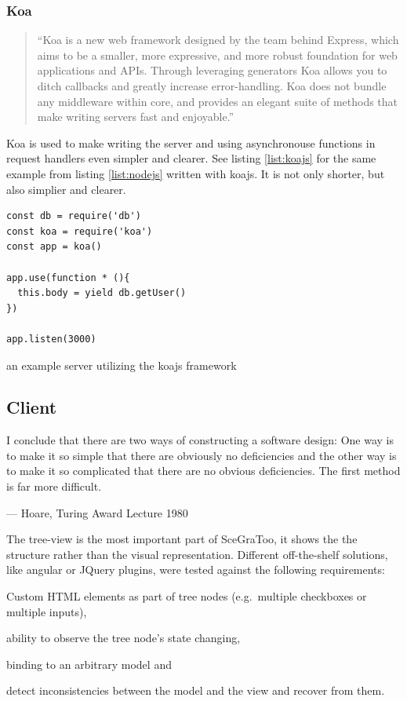 \subsubsection{Koa}
\label{par:Koa}
\begin{quote}
  ``Koa is a new web framework designed by the team behind Express, which aims to be a smaller, more expressive, and more robust foundation for web applications and APIs. Through leveraging generators Koa allows you to ditch callbacks and greatly increase error-handling. Koa does not bundle any middleware within core, and provides an elegant suite of methods that make writing servers fast and enjoyable.'' \cite{koajs}
\end{quote}

Koa is used to make writing the server and using asynchronouse functions in request handlers even simpler and clearer.
See listing \ref{list:koajs} for the same example from listing \ref{list:nodejs} written with koajs.
It is not only shorter, but also simplier and clearer.

\begin{listing}
  \begin{verbatim}
const db = require('db')
const koa = require('koa')
const app = koa()

app.use(function * (){
  this.body = yield db.getUser()
})

app.listen(3000)
  \end{verbatim}
  \caption{an example server utilizing the koajs framework}
  \label{list:koajs}
\end{listing}

\subsection{Client}
\label{client}

\epigraph{I conclude that there are two ways of constructing a software design:
One way is to make it so simple that there are obviously no deficiencies
and the other way is to make it so complicated that there are no obvious
deficiencies. The first method is far more difficult.}{--- Hoare, Turing Award Lecture 1980}

The tree-view is the most important part of SceGraToo, it shows the
the structure rather than the visual representation. Different
off-the-shelf solutions, like angular or JQuery plugins, were tested
against the following requirements:

\begin{enumerate*}
  \item Custom \gls{HTML} elements as part of tree nodes (e.g.~multiple checkboxes or multiple inputs),
  \item ability to observe the tree node's state changing,
  \item binding to an arbitrary model and
  \item detect inconsistencies between the model and the view and recover from them.
\end{enumerate*}

